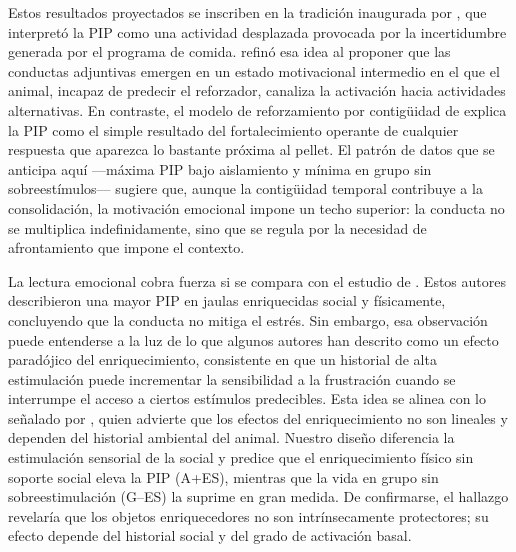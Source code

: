 \documentclass[12pt,a4paper]{article}
\begin{document}
\begin{multicols}{2}
Estos resultados proyectados se inscriben en la tradición inaugurada por \citet{Falk1961}, que interpretó la PIP como una actividad desplazada provocada por la incertidumbre generada por el programa de comida. \citet{Staddon1977} refinó esa idea al proponer que las conductas adjuntivas emergen en un estado motivacional intermedio en el que el animal, incapaz de predecir el reforzador, canaliza la activación hacia actividades alternativas. En contraste, el modelo de reforzamiento por contigüidad de \citet{Killeen2013} explica la PIP como el simple resultado del fortalecimiento operante de cualquier respuesta que aparezca lo bastante próxima al pellet. El patrón de datos que se anticipa aquí —máxima PIP bajo aislamiento y mínima en grupo sin sobreestímulos— sugiere que, aunque la contigüidad temporal contribuye a la consolidación, la motivación emocional impone un techo superior: la conducta no se multiplica indefinidamente, sino que se regula por la necesidad de afrontamiento que impone el contexto.

La lectura emocional cobra fuerza si se compara con el estudio de \citet{FuentesVerdugo2023}. Estos autores describieron una mayor PIP en jaulas enriquecidas social y físicamente, concluyendo que la conducta no mitiga el estrés. Sin embargo, esa observación puede entenderse a la luz de lo que algunos autores han descrito como un efecto paradójico del enriquecimiento, consistente en que un historial de alta estimulación puede incrementar la sensibilidad a la frustración cuando se interrumpe el acceso a ciertos estímulos predecibles. Esta idea se alinea con lo señalado por \citet{Wurbel2001}, quien advierte que los efectos del enriquecimiento no son lineales y dependen del historial ambiental del animal. Nuestro diseño diferencia la estimulación sensorial de la social y predice que el enriquecimiento físico sin soporte social eleva la PIP (A+ES), mientras que la vida en grupo sin sobreestimulación (G--ES) la suprime en gran medida. De confirmarse, el hallazgo revelaría que los objetos enriquecedores no son intrínsecamente protectores; su efecto depende del historial social y del grado de activación basal.


\end{multicols}
\end{document}
